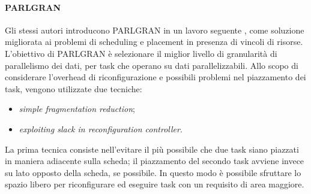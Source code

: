 \paragraph{PARLGRAN}
Gli stessi autori introducono PARLGRAN in un lavoro seguente 
\cite{BanerjeePARLGRAN}, come soluzione migliorata ai problemi di 
scheduling e placement in presenza di vincoli di risorse. L'obiettivo di 
PARLGRAN è selezionare il miglior livello di granularità di parallelismo dei 
dati, per task che operano su dati parallelizzabili. Allo scopo di considerare 
l'overhead di riconfigurazione e possibili problemi nel piazzamento dei task, 
vengono utilizzate due tecniche:
\begin{itemize}
 \item \emph{simple fragmentation reduction};
 \item \emph{exploiting slack in reconfiguration controller}.
\end{itemize}
La prima tecnica consiste nell'evitare il più possibile che due task siano 
piazzati in maniera adiacente sulla scheda; il piazzamento del secondo task 
avviene invece su lato opposto della scheda, se possibile. In questo modo è 
possibile sfruttare lo spazio libero per riconfigurare ed eseguire task con un 
requisito di area maggiore.

